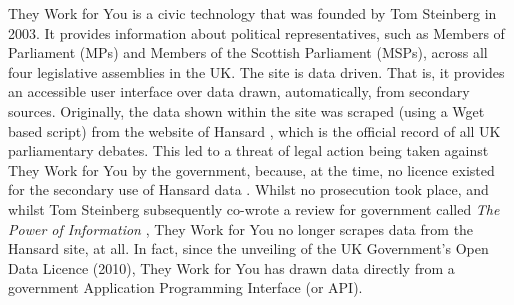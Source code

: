 They Work for You is a civic technology that was founded by Tom Steinberg \cite{tom-steinberg} in 2003.
It provides information about political representatives, such as Members of Parliament (MPs) and Members of the Scottish Parliament (MSPs), across all four legislative assemblies in the UK.
The site is data driven.
That is, it provides an accessible user interface over data drawn, automatically, from secondary sources.
Originally, the data shown within the site was scraped (using a Wget \cite{wget} based script) from the website of Hansard \cite{hansard}, which is the official record of all UK parliamentary debates.
This led to a threat of legal action being taken against They Work for You by the government, because, at the time, no licence existed for the secondary use of Hansard data \cite{they-work-for-you-controversies}.
Whilst no prosecution took place, and whilst Tom Steinberg subsequently co-wrote a review for government called \emph{The Power of Information} \cite{power-of-information}, They Work for You
no longer scrapes data from the Hansard site, at all.
In fact, since the unveiling of the UK Government's Open Data Licence \cite{open-data-licence} (2010), They Work for You has drawn data directly from a government Application Programming Interface \cite{api} (or API).